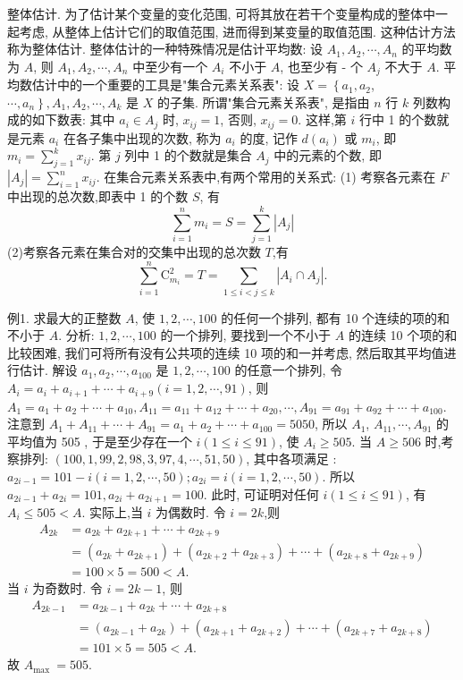 
整体估计.
为了估计某个变量的变化范围, 可将其放在若干个变量构成的整体中一起考虑, 从整体上估计它们的取值范围, 进而得到某变量的取值范围.
这种估计方法称为整体估计.
整体估计的一种特殊情况是估计平均数: 设 $A_1, A_2, \cdots, A_n$ 的平均数为 $A$, 则 $A_1, A_2, \cdots, A_n$ 中至少有一个 $A_i$ 不小于 $A$, 也至少有 - 个 $A_j$ 不大于 $A$.
平均数估计中的一个重要的工具是"集合元素关系表": 设 $X=\left\{a_1, a_2\right.$, $\left.\cdots, a_n\right\}, A_1, A_2, \cdots, A_k$ 是 $X$ 的子集.
所谓"集合元素关系表", 是指由 $n$ 行 $k$ 列数构成的如下数表:
其中 $a_i \in A_j$ 时, $x_{i j}=1$, 否则, $x_{i j}=0$. 这样,第 $i$ 行中 1 的个数就是元素 $a_i$ 在各子集中出现的次数, 称为 $a_i$ 的度, 记作 $d\left(a_i\right)$ 或 $m_i$, 即 $m_i=\sum_{j=1}^k x_{i j}$.
第 $j$ 列中 1 的个数就是集合 $A_j$ 中的元素的个数, 即 $\left|A_j\right|=\sum_{i=1}^n x_{i j}$.
在集合元素关系表中,有两个常用的关系式:
(1) 考察各元素在 $F$ 中出现的总次数,即表中 1 的个数 $S$, 有
$$
\sum_{i=1}^n m_i=S=\sum_{j=1}^k\left|A_j\right|
$$
(2)考察各元素在集合对的交集中出现的总次数 $T$,有
$$
\sum_{i=1}^n \mathrm{C}_{m_i}^2=T=\sum_{1 \leqslant i<j \leqslant k}\left|A_i \cap A_j\right| .
$$



例1. 求最大的正整数 $A$, 使 $1,2, \cdots, 100$ 的任何一个排列, 都有 10 个连续的项的和不小于 $A$. 
分析: $1,2, \cdots, 100$ 的一个排列, 要找到一个不小于 $A$ 的连续 10 个项的和比较困难, 我们可将所有没有公共项的连续 10 项的和一并考虑, 然后取其平均值进行估计.
解设 $a_1, a_2, \cdots, a_{100}$ 是 $1,2, \cdots, 100$ 的任意一个排列, 令 $A_i=a_i+ a_{i+1}+\cdots+a_{i+9}(i=1,2, \cdots, 91)$, 则 $A_1=a_1+a_2+\cdots+a_{10}, A_{11}=a_{11}+ a_{12}+\cdots+a_{20}, \cdots, A_{91}=a_{91}+a_{92}+\cdots+a_{100}$.
注意到 $A_1+A_{11}+\cdots+A_{91}=a_1+a_2+\cdots+a_{100}=5050$, 所以 $A_1$, $A_{11}, \cdots, A_{91}$ 的平均值为 505 , 于是至少存在一个 $i(1 \leqslant i \leqslant 91)$, 使 $A_i \geqslant 505$.
当 $A \geqslant 506$ 时,考察排列: $(100,1,99,2,98,3,97,4, \cdots, 51,50)$, 其中各项满足 : $a_{2 i-1}=101-i(i=1,2, \cdots, 50) ; a_{2 i}=i(i=1,2, \cdots, 50)$. 所以 $a_{2 i-1}+a_{2 i}=101, a_{2 i}+a_{2 i+1}=100$. 此时, 可证明对任何 $i(1 \leqslant i \leqslant 91)$, 有 $A_i \leqslant 505<A$.
实际上,当 $i$ 为偶数时.
令 $i=2 k$,则
$$
\begin{aligned}
A_{2 k} & =a_{2 k}+a_{2 k+1}+\cdots+a_{2 k+9} \\
& =\left(a_{2 k}+a_{2 k+1}\right)+\left(a_{2 k+2}+a_{2 k+3}\right)+\cdots+\left(a_{2 k+8}+a_{2 k+9}\right) \\
& =100 \times 5=500<A .
\end{aligned}
$$
当 $i$ 为奇数时.
令 $i=2 k-1$, 则
$$
\begin{aligned}
A_{2 k-1} & =a_{2 k-1}+a_{2 k}+\cdots+a_{2 k+8} \\
& =\left(a_{2 k-1}+a_{2 k}\right)+\left(a_{2 k+1}+a_{2 k+2}\right)+\cdots+\left(a_{2 k+7}+a_{2 k+8}\right) \\
& =101 \times 5=505<A .
\end{aligned}
$$
故 $A_{\text {max }}=505$.



